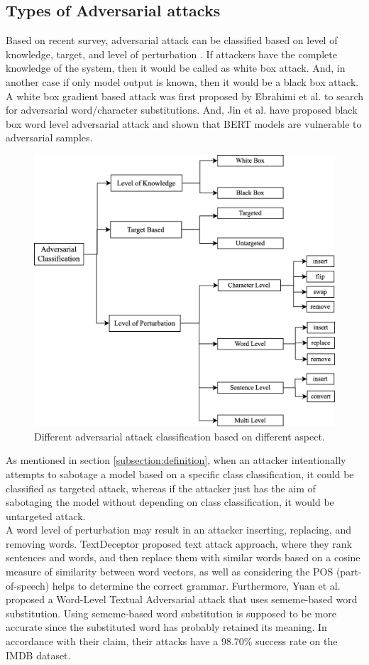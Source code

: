 \documentclass[%
	BCOR=8mm, %
	DIV=12,
	toc=bibliography, %
	toc=listof, %
	oneside, %
	egregdoesnotlikesansseriftitles, %
	]{scrbook}
\begin{document}
\subsection{Types of Adversarial attacks}
\label{subsection:attacktypes}
Based on recent survey, adversarial attack can be classified based on level of knowledge, target, and level of perturbation \cite{huq_adversarial_2020,wang_towards_2021}. If attackers have the complete knowledge of the system, then it would be called as  white box attack. And, in another case if only model output is known, then it would be a black box attack. A white box gradient based attack was first proposed by Ebrahimi et al. \cite{ebrahimi_hotflip_2018} to search for adversarial word/character substitutions. And, Jin et al. \cite{jin_is_2020} have proposed black box word level adversarial attack and shown that BERT models are vulnerable to adversarial samples.\\
\begin{figure}[h!]
    \centering
    \includegraphics[width=0.6\linewidth]{img/attack_classification.png}
    \caption[Adversarial attacks classification diagram]{Different adversarial attack classification based on different aspect.}
    \label{fig:attack_classification}
\end{figure}
As mentioned in section \ref{subsection:definition}, when an attacker intentionally attempts to sabotage a model based on a specific class classification, it could be classified as targeted attack, whereas if the attacker just has the aim of sabotaging the model without depending on class classification, it would be untargeted attack.\\
A word level of perturbation may result in an attacker inserting, replacing, and removing words. TextDeceptor \cite{saxena_textdecepter_2020} proposed text attack approach, where they rank sentences and words, and then replace them with similar words based on a cosine measure of similarity between word vectors, as well as considering the POS (part-of-speech) helps to determine the correct grammar. Furthermore, Yuan et al. \cite{zang_word-level_2019} proposed a Word-Level Textual Adversarial attack that uses sememe-based word substitution. Using sememe-based word substitution is supposed to be more accurate since the substituted word has probably retained its meaning. In accordance with their claim, their attacks have a 98.70\% success rate on the IMDB dataset.\\
\end{document}
